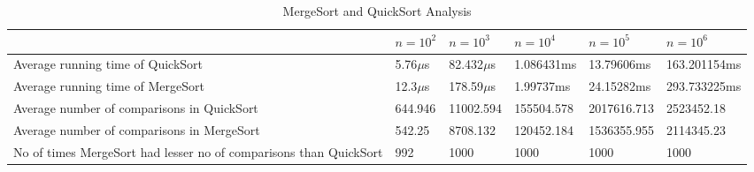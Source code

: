 \documentclass[a4paper,10pt]{article}
\begin{document}
    
        \begin{table}
    		\begin{tabular}{ |p{4cm}||p{2cm}|p{2cm}|p{2cm}|p{2cm}|p{2cm}|  }
    		
    			\hline
                & $n=10^2$ & $n=10^3$ & $n=10^4$ & $n=10^5$ & $n=10^6$ \\
    			\hline
    			Average running time of QuickSort & 5.76$\mu$s & 82.432$\mu$s & 1.086431ms & 13.79606ms & 163.201154ms \\
    			\hline
    			Average running time of MergeSort & 12.3$\mu$s & 178.59$\mu$s  & 1.99737ms  & 24.15282ms & 293.733225ms \\
    			\hline
    			Average number of comparisons in QuickSort & 644.946 & 11002.594 & 155504.578 & 2017616.713 & 2523452.18 \\
    			\hline
    			Average number of comparisons in MergeSort & 542.25 & 8708.132 & 120452.184 & 1536355.955 & 2114345.23 \\
    			\hline
    			No of times MergeSort had lesser no of comparisons than QuickSort & 992 & 1000 & 1000 & 1000 & 1000 \\
    			\hline
    			
    		\end{tabular}
            \caption{MergeSort and QuickSort Analysis}
        \end{table}
        
\end{document}
